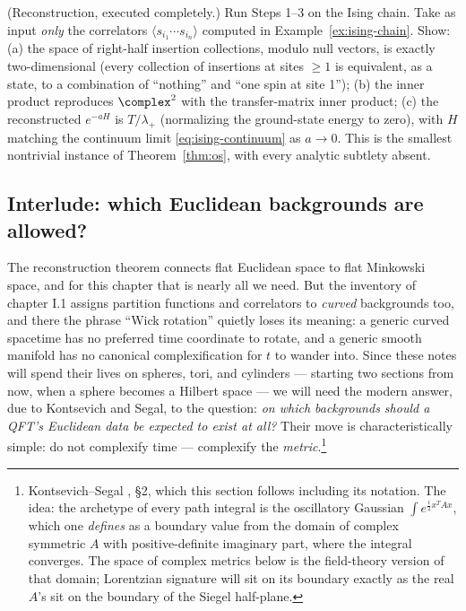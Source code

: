 \begin{exercise}[classic]
\label{exr:os-chain}
(Reconstruction, executed completely.) Run Steps 1--3 on the Ising chain.
Take as input \emph{only} the correlators $\langle s_{i_1}\cdots
s_{i_n}\rangle$ computed in Example~\ref{ex:ising-chain}. Show: (a) the space
of right-half insertion collections, modulo null vectors, is exactly
two-dimensional (every collection of insertions at sites $\ge 1$ is equivalent,
as a state, to a combination of ``nothing'' and ``one spin at site 1''); (b)
the inner product reproduces $\complex^2$ with the transfer-matrix inner
product; (c) the reconstructed $e^{-aH}$ is $T/\lambda_+$ (normalizing the
ground-state energy to zero), with $H$ matching the continuum limit
\eqref{eq:ising-continuum} as $a \to 0$. This is the smallest nontrivial
instance of Theorem~\ref{thm:os}, with every analytic subtlety absent.
\end{exercise}

\subsection{Interlude: which Euclidean backgrounds are allowed?}
\label{sec:ks-interlude}

The reconstruction theorem connects flat Euclidean space to flat Minkowski
space, and for this chapter that is nearly all we need. But the inventory of
chapter I.1 assigns partition functions and correlators to \emph{curved}
backgrounds too, and there the phrase ``Wick rotation'' quietly loses its
meaning: a generic curved spacetime has no preferred time coordinate to rotate,
and a generic smooth manifold has no canonical complexification for $t$ to
wander into. Since these notes will spend their lives on spheres, tori, and
cylinders --- starting two sections from now, when a sphere becomes a Hilbert
space --- we will need the modern answer, due to Kontsevich and Segal,
to the question: \emph{on which backgrounds should a QFT's Euclidean data be
expected to exist at all?} Their move is characteristically simple: do not
complexify time --- complexify the \emph{metric}.\footnote{Kontsevich--Segal
, \S2, which this section follows including its notation.
The idea: the archetype of every path integral is the oscillatory Gaussian
$\int e^{\frac i2 x^T A x}$, which one \emph{defines} as a boundary value from
the domain of complex symmetric $A$ with positive-definite imaginary part,
where the integral converges. The space of complex metrics below is
the field-theory version of that domain; Lorentzian signature will sit on its
boundary exactly as the real $A$'s sit on the boundary of the Siegel
half-plane.}


